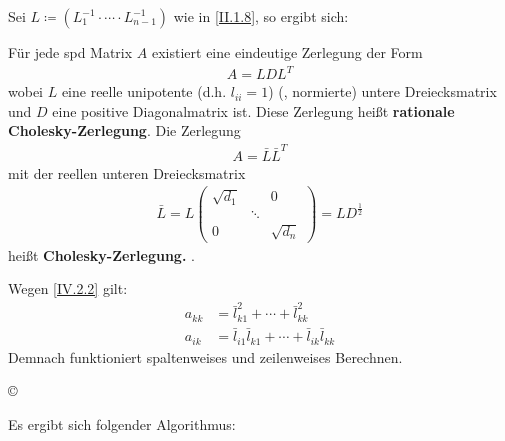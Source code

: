 Sei $L\coloneqq (L_1^{-1}\cdot \cdots \cdot L_{n-1}^{-1})$ wie in \eqref{II.1.8}, so ergibt sich:



\begin{Fole}
  \label{4.2.2}
  Für jede spd Matrix $A$ existiert eine eindeutige Zerlegung der Form 
  \begin{gather*}
    A= LDL^T
  \end{gather*}
  wobei $L$ eine reelle unipotente (d.h. $l_{ii}=1$)  (, normierte)  untere 
  Dreiecksmatrix  und $D$ eine positive Diagonalmatrix ist. 
  Diese Zerlegung heißt \textbf{rationale Cholesky-Zerlegung}. Die Zerlegung
  \begin{gather}
    A= \bar{L}\bar{L}^T 
    \label{IV.2.2}
  \end{gather}
  mit der reellen unteren Dreiecksmatrix
  \begin{gather*}
    \bar{L} = L \begin{pmatrix}
      \sqrt{d_1} &&0 \\
      & \ddots & \\
      0&& \sqrt{d_n}
    \end{pmatrix} = LD^{\frac{1}{2}}
  \end{gather*}
  heißt \textbf{Cholesky-Zerlegung.} .
  
  Wegen \eqref{IV.2.2} gilt: 
  \begin{align}
    a_{kk} &= \bar{l}_{k1}^{2} + \cdots +  \bar{l}_{kk}^2  \label{IV.2.3} \\
    a_{ik} &= \bar{l}_{i1} \bar{l}_{k1} + \cdots + \bar{l}_{ik} \bar{l}_{kk}  \label{IV.2.4}
  \end{align}
  Demnach funktioniert spaltenweises und zeilenweises Berechnen. 
  
  \begin{image}{\copyright}
  \end{image}{}
\end{Fole}

Es ergibt sich folgender Algorithmus:


